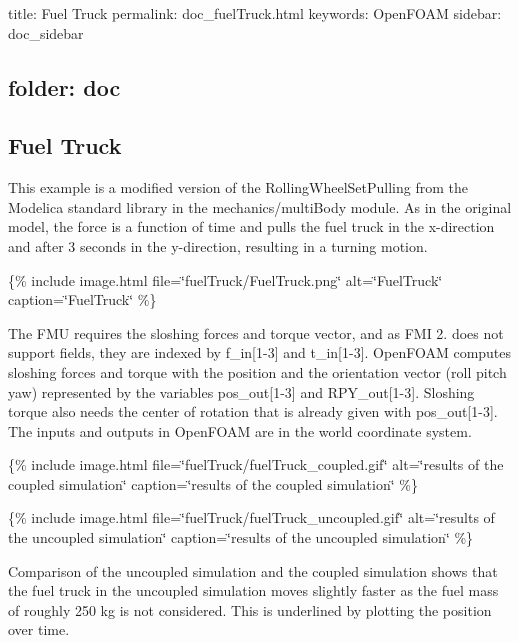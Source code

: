 

 title\+: Fuel Truck permalink\+: doc\+\_\+fuel\+Truck.\+html keywords\+: Open\+F\+O\+AM sidebar\+: doc\+\_\+sidebar \subsection*{folder\+: doc }

\subsection*{Fuel Truck}

This example is a modified version of the Rolling\+Wheel\+Set\+Pulling from the Modelica standard library in the mechanics/multi\+Body module. As in the original model, the force is a function of time and pulls the fuel truck in the x-\/direction and after 3 seconds in the y-\/direction, resulting in a turning motion.

\{\% include image.\+html file=\char`\"{}fuel\+Truck/\+Fuel\+Truck.\+png\char`\"{} alt=\char`\"{}\+Fuel\+Truck\char`\"{} caption=\char`\"{}\+Fuel\+Truck\char`\"{} \%\}

The F\+MU requires the sloshing forces and torque vector, and as F\+MI 2. does not support fields, they are indexed by {\ttfamily f\+\_\+in\mbox{[}1-\/3\mbox{]}} and {\ttfamily t\+\_\+in\mbox{[}1-\/3\mbox{]}}. Open\+F\+O\+AM computes sloshing forces and torque with the position and the orientation vector (roll pitch yaw) represented by the variables {\ttfamily pos\+\_\+out\mbox{[}1-\/3\mbox{]}} and {\ttfamily R\+P\+Y\+\_\+out\mbox{[}1-\/3\mbox{]}}. Sloshing torque also needs the center of rotation that is already given with {\ttfamily pos\+\_\+out\mbox{[}1-\/3\mbox{]}}. The inputs and outputs in Open\+F\+O\+AM are in the world coordinate system.

\{\% include image.\+html file=\char`\"{}fuel\+Truck/fuel\+Truck\+\_\+coupled.\+gif\char`\"{} alt=\char`\"{}results of the coupled simulation\char`\"{} caption=\char`\"{}results of the coupled simulation\char`\"{} \%\}

\{\% include image.\+html file=\char`\"{}fuel\+Truck/fuel\+Truck\+\_\+uncoupled.\+gif\char`\"{} alt=\char`\"{}results of the uncoupled simulation\char`\"{} caption=\char`\"{}results of the uncoupled simulation\char`\"{} \%\}

Comparison of the uncoupled simulation and the coupled simulation shows that the fuel truck in the uncoupled simulation moves slightly faster as the fuel mass of roughly 250 kg is not considered. This is underlined by plotting the position over time.

